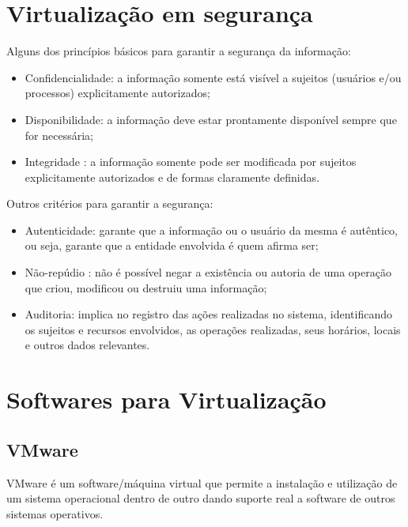 \section{Virtualização em segurança}
Alguns dos princípios básicos para garantir a segurança da informação:
\begin{itemize}
\item Confidencialidade: a informação somente está visível a sujeitos (usuários e/ou processos) explicitamente autorizados;
\item Disponibilidade: a informação deve estar prontamente disponível sempre que for necessária;
\item Integridade : a informação somente pode ser modificada por sujeitos explicitamente autorizados e de formas claramente definidas.
\end{itemize}
Outros critérios para garantir a segurança:
\begin{itemize}
\item Autenticidade: garante que a informação ou o usuário da mesma é autêntico, ou seja, garante que a entidade envolvida é quem afirma ser;
\item Não-repúdio : não é possível negar a existência ou autoria de uma operação que criou, modificou ou destruiu uma informação;
\item Auditoria: implica no registro das ações realizadas no sistema, identificando os sujeitos e recursos envolvidos, as operações realizadas, seus horários, locais e outros dados relevantes.
\end{itemize}

\section{Softwares para Virtualização}
\subsection{VMware}
VMware é um software/máquina virtual que permite a instalação e utilização de um sistema operacional dentro de outro dando suporte real a software de outros sistemas operativos.

